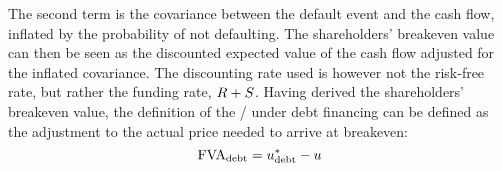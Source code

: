 \documentclass[../main.tex]{subfiles}
\begin{document}
            The second term is the covariance between the default event and the cash flow,
            inflated by the probability of not defaulting. 
            The shareholders' breakeven value can then be seen as the discounted expected value of the cash flow
            adjusted for the inflated covariance.
            The discounting rate used is however not the risk-free rate, but rather the funding rate, $R+S$.
            Having derived the shareholders' breakeven value, the definition of the \FVA/ under debt financing
            can be defined as the adjustment to the actual price needed to arrive at breakeven:
                \begin{equation}
                    \FVA/_{\text{debt}} 
                        = u^{\ast}_{\text{debt}} - u
                    \label{eqn:fva-debt-financing}
                \end{equation}
\end{document}
